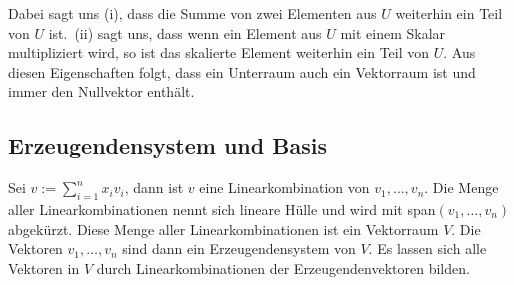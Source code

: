 Dabei sagt uns (i), dass die Summe von zwei Elementen aus \( U \) weiterhin ein Teil von \( U \) ist.\ (ii) sagt uns, dass wenn ein Element aus \( U \) mit einem Skalar multipliziert wird, so ist das skalierte Element weiterhin ein Teil von \( U \). Aus diesen Eigenschaften folgt, dass ein Unterraum auch ein Vektorraum ist und immer den Nullvektor enthält.

\subsection{Erzeugendensystem und Basis}

Sei \( v:= \sum_{i=1}^{n}x_i v_i \), dann ist \( v \) eine Linearkombination von \( v_1, \dots, v_n \). Die Menge aller Linearkombinationen nennt sich lineare Hülle und wird mit span\( (v_1, \dots, v_n) \) abgekürzt. Diese Menge aller Linearkombinationen ist ein Vektorraum \( V\). Die Vektoren \( v_1, \dots, v_n \)  sind dann ein Erzeugendensystem von \( V \). Es lassen sich alle Vektoren in \( V \) durch Linearkombinationen der Erzeugendenvektoren bilden. 

